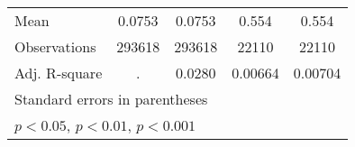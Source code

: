 \begin{table}[htbp]
{\begin{tabular}{l*{4}{c}}
            \midrule
            Mean                   & 0.0753                               & 0.0753                               & 0.554                   & 0.554                   \\
            Observations           & 293618                               & 293618                               & 22110                   & 22110                   \\
            Adj. R-square          & .                                    & 0.0280                               & 0.00664                 & 0.00704                 \\
            \bottomrule
            \multicolumn{5}{l}{\footnotesize Standard errors in parentheses}                                                                                         \\
            \multicolumn{5}{l}{\footnotesize \sym{*} \(p<0.05\), \sym{**} \(p<0.01\), \sym{***} \(p<0.001\)}                                                         \\
        \end{tabular}}
\end{table}
